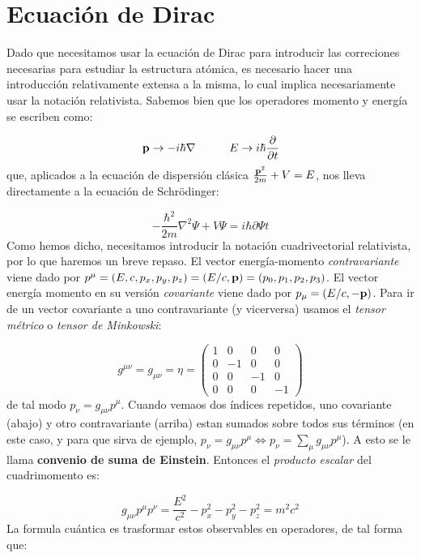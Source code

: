 \section{Ecuación de Dirac}

Dado que necesitamos usar la ecuación de Dirac para introducir las correciones necesarias para estudiar la estructura atómica, es necesario hacer una introducción relativamente extensa a la misma, lo cual implica necesariamente usar la notación relativista. Sabemos bien que los operadores momento y energía se escriben como:

\begin{equation}
    \mathbf{p} \rightarrow - i\hbar \nabla \quad \quad \quad E \rightarrow i \hbar \frac{\partial }{\partial t}
\end{equation}
que, aplicados a la ecuación de dispersión clásica $\frac{\mathbf{p}^2}{2m} + V = E$, nos lleva directamente a la ecuación de Schrödinger:

\begin{equation}
    -\frac{\hbar^2}{2m} \nabla^2 \Psi + V\Psi = i \hbar \partial{\Psi}{t}
\end{equation}
Como hemos dicho, necesitamos introducir la notación cuadrivectorial relativista, por lo que haremos un breve repaso. El vector energía-momento {\it contravariante} viene dado por $p^{\mu} = (E,c,p_x,p_y,p_z) = (E/c,\mathbf{p}) = (p_0,p_1,p_2,p_3)$. El vector energía momento en su versión {\it covariante} viene dado por $p_{\mu} = (E/c,-\mathbf{p})$. Para ir de un vector covariante a uno contravariante (y vicerversa) usamos el {\it tensor métrico} o {\it tensor de Minkowski}:

\begin{equation}
    g^{\mu \nu} = g_{\mu \nu} = 
    \eta = \begin{pmatrix}
    1 & 0 & 0 & 0 \\
    0 & -1 & 0 & 0 \\
    0 & 0 & -1 & 0 \\
    0 & 0 & 0 & -1
    \end{pmatrix}
\end{equation}
de tal modo $p_{\nu} = g_{\mu \nu} p^{\mu}$. Cuando vemaos dos índices repetidos, uno covariante (abajo) y otro contravariante (arriba) estan sumados sobre todos sus términos (en este caso, y para que sirva de ejemplo,  $p_{\nu} = g_{\mu \nu} p^{\mu} \Leftrightarrow p_{\nu} = \sum_{\mu} g_{\mu \nu} p^{\mu} $). A esto se le llama {\bf convenio de suma de Einstein}. Entonces el {\it producto escalar} del cuadrimomento es:

\begin{equation}
    g_{\mu \nu}p^{\mu} p^{\nu} = \frac{E^2}{c^2} - p_x^2 - p_y^2 - p_z^2 = m^2 c^2
\end{equation}
La formula cuántica es trasformar estos observables en operadores, de tal forma que:

